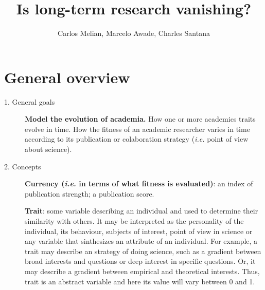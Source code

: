 \documentclass[12pt,a4paper]{article}
\begin{document}
\setlength{\parindent}{20pt}

\begin{titlepage}
\author{Carlos Melian, Marcelo Awade, Charles Santana} %
\title{\textbf{Is long-term research vanishing?}}
\maketitle
\end{titlepage}

\doublespacing

\section*{General overview}
\begin{description}
 \item[1. General goals] \hfill
 
\textbf{Model the evolution of academia.}
How one or more academics traits evolve in time.
How the fitness of an academic researcher varies in time according to its publication or colaboration strategy (\textit{i.e.} point of view about science).
	
\item[2. Concepts] \hfill 
	
\textbf{Currency (\textit{i.e.} in terms of what fitness is evaluated)}: an index of publication strength; a publication score.
	
\textbf{Trait}: some variable describing an individual and used to determine their similarity with others.
It may be interpreted as the personality of the individual, its behaviour, subjects of interest, point of view in science or any variable that sinthesizes an attribute of an individual. 
For example, a trait may describe an strategy of doing science, such as a gradient between broad interests and questions or deep interest in specific questions. 
Or, it may describe a gradient between empirical and theoretical interests.
Thus, trait is an abstract variable and here its value will vary between 0 and 1.


\end{description}
\end{document}
